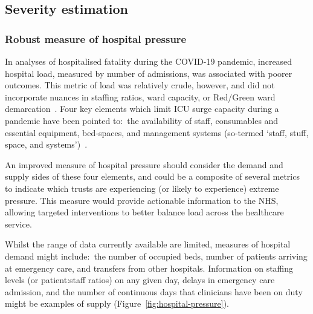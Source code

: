 \subsection{Severity estimation}

\subsubsection{Robust measure of hospital pressure}

In analyses of hospitalised fatality during the COVID-19 pandemic, increased hospital load, measured by number of admissions, was associated with poorer outcomes. This metric of load was relatively crude, however, and did not incorporate nuances in staffing ratios, ward capacity, or Red/Green ward demarcation~\parencite{NHS-England2020-xg}. Four key elements which limit ICU surge capacity during a pandemic have been pointed to:\ the availability of staff, consumables and essential equipment, bed-spaces, and management systems (so-termed `staff, stuff, space, and systems')~\parencite{Fong2024-hy, Gabriel2019-xm}.

An improved measure of hospital pressure should consider the demand and supply sides of these four elements, and could be a composite of several metrics to indicate which trusts are experiencing (or likely to experience) extreme pressure. This measure would provide actionable information to the NHS, allowing targeted interventions to better balance load across the healthcare service.

Whilst the range of data currently available are limited, measures of hospital demand might include:\ the number of occupied beds, number of patients arriving at emergency care, and transfers from other hospitals. Information on staffing levels (or patient:staff ratios) on any given day, delays in emergency care admission, and the number of continuous days that clinicians have been on duty might be examples of supply (Figure~\ref{fig:hospital-pressure}).

